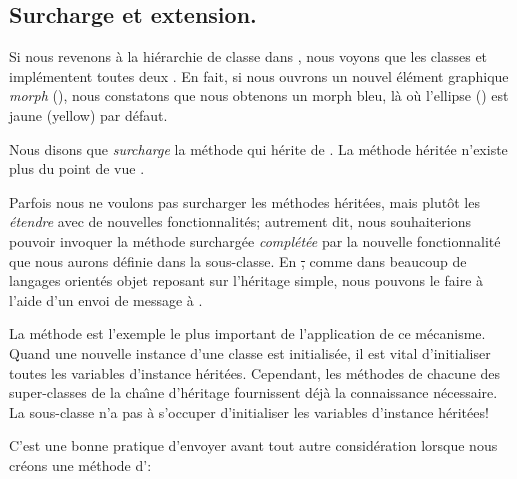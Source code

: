 \documentclass[a4paper,10pt,twoside]{book}
\begin{document}

\subsection{Surcharge et extension.}

Si nous revenons \`a la hi\'erarchie de classe  dans , nous voyons que les classes  et \mbox{} impl\'ementent toutes deux .
En fait, si nous ouvrons un nouvel \'el\'ement graphique \emph{morph} (), nous constatons que nous obtenons un morph bleu, l\`a o\`u l'ellipse () est jaune (yellow) par d\'efaut.

Nous disons que  \emph{surcharge} la m\'ethode  qui h\'erite de .
La m\'ethode h\'erit\'ee n'existe plus du point de vue .

Parfois nous ne voulons pas surcharger les m\'ethodes h\'erit\'ees, mais plut\^ot les \emph{\'etendre} avec de nouvelles fonctionnalit\'es; autrement dit, nous souhaiterions pouvoir invoquer la m\'ethode surcharg\'ee \emph{compl\'et\'ee} par la nouvelle fonctionnalit\'e que nous aurons d\'efinie dans la sous-classe.
En \st, comme dans beaucoup de langages orient\'es objet reposant sur l'h\'eritage simple, nous pouvons le faire \`a l'aide d'un envoi de message \`a \super.

La m\'ethode  est l'exemple le plus important de l'application de ce m\'ecanisme.
Quand une nouvelle instance d'une classe est initialis\'ee, il est vital
d'initialiser toutes les variables d'instance h\'erit\'ees.
Cependant, les m\'ethodes  de chacune des super-classes
de la cha\^{\i}ne d'h\'eritage fournissent d\'ej\`a la connaissance
n\'ecessaire. 
La sous-classe n'a pas \`a s'occuper d'initialiser les variables d'instance h\'erit\'ees!

C'est une bonne pratique d'envoyer  avant tout autre consid\'eration lorsque nous cr\'eons une m\'ethode d':
\arevoir{}%
\end{document}
